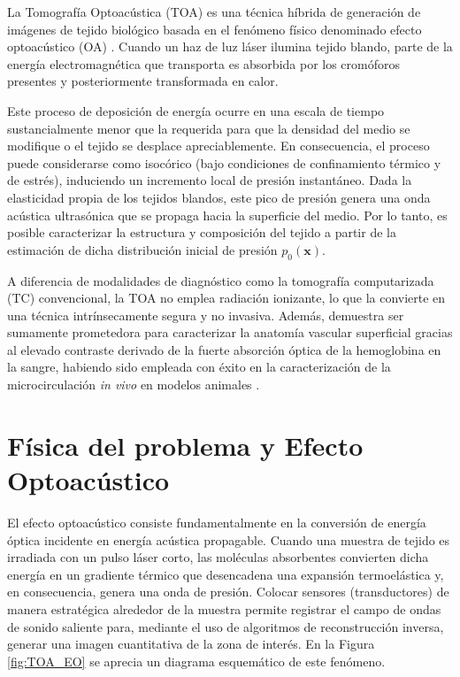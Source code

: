 \label{cap:pipeline_toa}

La Tomografía Optoacústica (TOA) es una técnica híbrida de generación de imágenes de tejido biológico basada en el fenómeno físico denominado efecto optoacústico (OA) \cite{DiLiscia2026}. Cuando un haz de luz láser ilumina tejido blando, parte de la energía electromagnética que transporta es absorbida por los cromóforos presentes y posteriormente transformada en calor.

Este proceso de deposición de energía ocurre en una escala de tiempo sustancialmente menor que la requerida para que la densidad del medio se modifique o el tejido se desplace apreciablemente. En consecuencia, el proceso puede considerarse como isocórico (bajo condiciones de confinamiento térmico y de estrés), induciendo un incremento local de presión instantáneo. Dada la elasticidad propia de los tejidos blandos, este pico de presión genera una onda acústica ultrasónica que se propaga hacia la superficie del medio. Por lo tanto, es posible caracterizar la estructura y composición del tejido a partir de la estimación de dicha distribución inicial de presión $p_0(\mathbf{x})$.

A diferencia de modalidades de diagnóstico como la tomografía computarizada (TC) convencional, la TOA no emplea radiación ionizante, lo que la convierte en una técnica intrínsecamente segura y no invasiva.
Además, demuestra ser sumamente prometedora para caracterizar la anatomía vascular superficial gracias al elevado contraste derivado de la fuerte absorción óptica de la hemoglobina en la sangre, habiendo sido empleada con éxito en la caracterización de la microcirculación \textit{in vivo} en modelos animales \cite{DiLiscia2026}.

\section{Física del problema y Efecto Optoacústico}
\label{sec:fisica_problema}
El efecto optoacústico consiste fundamentalmente en la conversión de energía óptica incidente en energía acústica propagable. Cuando una muestra de tejido es irradiada con un pulso láser corto, las moléculas absorbentes convierten dicha energía en un gradiente térmico que desencadena una expansión termoelástica y, en consecuencia, genera una onda de presión. Colocar sensores (transductores) de manera estratégica alrededor de la muestra permite registrar el campo de ondas de sonido saliente para, mediante el uso de algoritmos de reconstrucción inversa, generar una imagen cuantitativa de la zona de interés.
En la Figura \ref{fig:TOA_EO} se aprecia un diagrama esquemático de este fenómeno.

